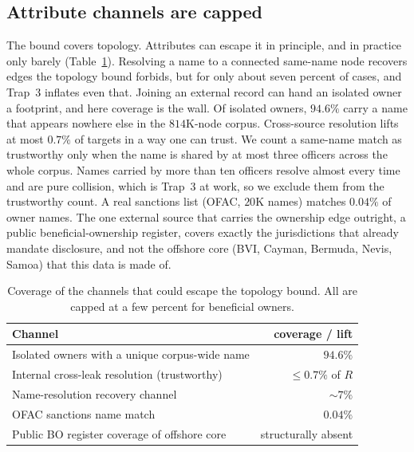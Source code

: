 \documentclass[sigconf]{acmart}
\begin{document}
\subsection{Attribute channels are capped}
The bound covers topology. Attributes can escape it in principle, and in practice
only barely (Table~\ref{tab:external}). Resolving a name to a connected same-name
node recovers edges the topology bound forbids, but for only about seven percent
of cases, and Trap~3 inflates even that. Joining an external record can hand an
isolated owner a footprint, and here coverage is the wall. Of isolated owners,
$94.6\%$ carry a name that appears nowhere else in the $814$K-node corpus.
Cross-source resolution lifts at most $0.7\%$ of targets in a way one can trust.
We count a same-name match as trustworthy only when the name is shared by at most
three officers across the whole corpus. Names carried by more than ten officers
resolve almost every time and are pure collision, which is Trap~3 at work, so we
exclude them from the trustworthy count. A real sanctions list (OFAC, $20$K names)
matches $0.04\%$ of owner names. The
one external source that carries the ownership edge outright, a public
beneficial-ownership register, covers exactly the jurisdictions that already
mandate disclosure, and not the offshore core (BVI, Cayman, Bermuda, Nevis, Samoa)
that this data is made of.

\begin{table}[t]
\caption{Coverage of the channels that could escape the topology bound. All are
capped at a few percent for beneficial owners.}
\label{tab:external}
\small
\begin{tabular}{@{}lr@{}}
\toprule
\textbf{Channel} & \textbf{coverage / lift}\\
\midrule
Isolated owners with a unique corpus-wide name & $94.6\%$\\
Internal cross-leak resolution (trustworthy)   & $\le 0.7\%$ of $R$\\
Name-resolution recovery channel               & $\sim 7\%$\\
OFAC sanctions name match                       & $0.04\%$\\
Public BO register coverage of offshore core    & structurally absent\\
\bottomrule
\end{tabular}
\end{table}
\end{document}
